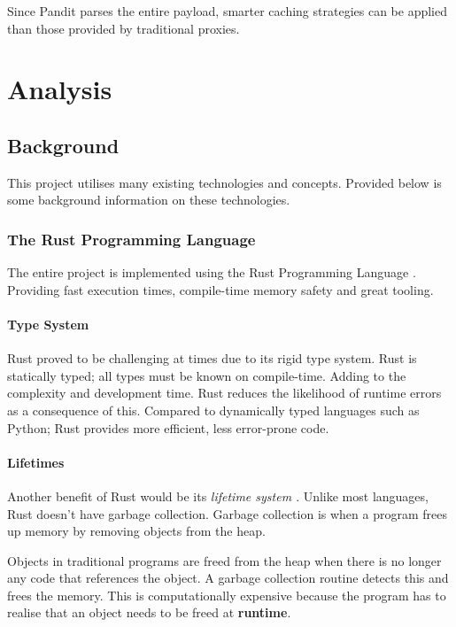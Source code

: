 \documentclass[a4paper,12pt]{report}
\begin{document}
Since Pandit parses the entire payload, smarter caching strategies can be applied than those provided by traditional proxies.

\chapter{Analysis}

\section{Background}

This project utilises many existing technologies and concepts. Provided below is some background information on these technologies.

\subsection{The Rust Programming Language}

The entire project is implemented using the Rust Programming Language \cite{rust}. Providing fast execution times, compile-time memory safety
and great tooling.

\subsubsection{Type System}
Rust proved to be challenging at times due to its rigid type system. Rust is statically typed; all types must be known on compile-time. Adding to the complexity and development time. Rust reduces the likelihood of runtime errors as a consequence of this. Compared to dynamically typed languages such as Python; Rust provides more efficient, less error-prone code.

\subsubsection{Lifetimes}
Another benefit of Rust would be its \textit{lifetime system \cite{lifetimes}}. Unlike most languages, Rust doesn't have garbage collection. 
Garbage collection is when a program frees up memory by removing objects from the heap. 

Objects in traditional programs are freed from the heap when there is no longer any code that references the object.
A garbage collection routine detects this and frees the memory.
This is computationally expensive because the program has to realise that an object needs to be freed at \textbf{runtime}.
\end{document}
